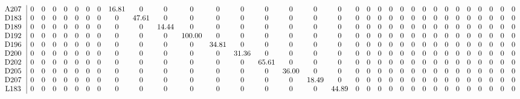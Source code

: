 \begin{table}[H]
\begin{center}
\begin{math}
\begin{array}{c|cccccccccccccccccccccccccccccccc}
\mathrm{A207} \hspace*{2pt} &  0 &  0 &  0 &  0 &  0 &  0 &  0 &      16.81 &  0 &  0 &  0 &  0 &  0 &  0 &  0 &  0 &  0 &  0 &  0 &  0 &  0 &  0 &  0 &  0 &  0 &  0 &  0 &  0 &  0 &  0 &  0 &  0 \\
\mathrm{D183} \hspace*{2pt} &  0 &  0 &  0 &  0 &  0 &  0 &  0 &  0 &      47.61 &  0 &  0 &  0 &  0 &  0 &  0 &  0 &  0 &  0 &  0 &  0 &  0 &  0 &  0 &  0 &  0 &  0 &  0 &  0 &  0 &  0 &  0 &  0 \\
\mathrm{D189} \hspace*{2pt} &  0 &  0 &  0 &  0 &  0 &  0 &  0 &  0 &  0 &      14.44 &  0 &  0 &  0 &  0 &  0 &  0 &  0 &  0 &  0 &  0 &  0 &  0 &  0 &  0 &  0 &  0 &  0 &  0 &  0 &  0 &  0 &  0 \\
\mathrm{D192} \hspace*{2pt} &  0 &  0 &  0 &  0 &  0 &  0 &  0 &  0 &  0 &  0 &     100.00 &  0 &  0 &  0 &  0 &  0 &  0 &  0 &  0 &  0 &  0 &  0 &  0 &  0 &  0 &  0 &  0 &  0 &  0 &  0 &  0 &  0 \\
\mathrm{D196} \hspace*{2pt} &  0 &  0 &  0 &  0 &  0 &  0 &  0 &  0 &  0 &  0 &  0 &      34.81 &  0 &  0 &  0 &  0 &  0 &  0 &  0 &  0 &  0 &  0 &  0 &  0 &  0 &  0 &  0 &  0 &  0 &  0 &  0 &  0 \\
\mathrm{D200} \hspace*{2pt} &  0 &  0 &  0 &  0 &  0 &  0 &  0 &  0 &  0 &  0 &  0 &  0 &      31.36 &  0 &  0 &  0 &  0 &  0 &  0 &  0 &  0 &  0 &  0 &  0 &  0 &  0 &  0 &  0 &  0 &  0 &  0 &  0 \\
\mathrm{D202} \hspace*{2pt} &  0 &  0 &  0 &  0 &  0 &  0 &  0 &  0 &  0 &  0 &  0 &  0 &  0 &      65.61 &  0 &  0 &  0 &  0 &  0 &  0 &  0 &  0 &  0 &  0 &  0 &  0 &  0 &  0 &  0 &  0 &  0 &  0 \\
\mathrm{D205} \hspace*{2pt} &  0 &  0 &  0 &  0 &  0 &  0 &  0 &  0 &  0 &  0 &  0 &  0 &  0 &  0 &      36.00 &  0 &  0 &  0 &  0 &  0 &  0 &  0 &  0 &  0 &  0 &  0 &  0 &  0 &  0 &  0 &  0 &  0 \\
\mathrm{D207} \hspace*{2pt} &  0 &  0 &  0 &  0 &  0 &  0 &  0 &  0 &  0 &  0 &  0 &  0 &  0 &  0 &  0 &      18.49 &  0 &  0 &  0 &  0 &  0 &  0 &  0 &  0 &  0 &  0 &  0 &  0 &  0 &  0 &  0 &  0 \\
\mathrm{L183} \hspace*{2pt} &  0 &  0 &  0 &  0 &  0 &  0 &  0 &  0 &  0 &  0 &  0 &  0 &  0 &  0 &  0 &  0 &      44.89 &  0 &  0 &  0 &  0 &  0 &  0 &  0 &  0 &  0 &  0 &  0 &  0 &  0 &  0 &  0 \\

\end{array}
\end{math}
\end{center}
\end{table}
